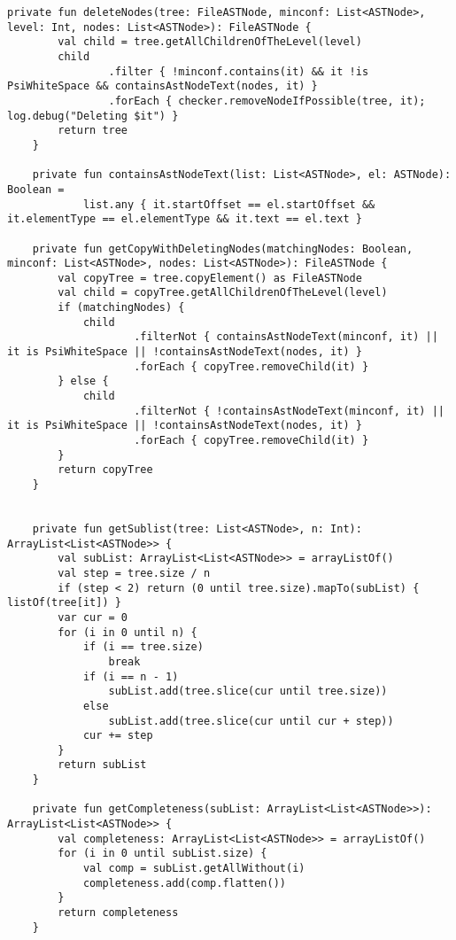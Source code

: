 \begin{lstlisting}[caption = Исходный код файла HierarchialDeltaDebugger.kt]
    private fun deleteNodes(tree: FileASTNode, minconf: List<ASTNode>, level: Int, nodes: List<ASTNode>): FileASTNode {
        val child = tree.getAllChildrenOfTheLevel(level)
        child
                .filter { !minconf.contains(it) && it !is PsiWhiteSpace && containsAstNodeText(nodes, it) }
                .forEach { checker.removeNodeIfPossible(tree, it); log.debug("Deleting $it") }
        return tree
    }

    private fun containsAstNodeText(list: List<ASTNode>, el: ASTNode): Boolean =
            list.any { it.startOffset == el.startOffset && it.elementType == el.elementType && it.text == el.text }

    private fun getCopyWithDeletingNodes(matchingNodes: Boolean, minconf: List<ASTNode>, nodes: List<ASTNode>): FileASTNode {
        val copyTree = tree.copyElement() as FileASTNode
        val child = copyTree.getAllChildrenOfTheLevel(level)
        if (matchingNodes) {
            child
                    .filterNot { containsAstNodeText(minconf, it) || it is PsiWhiteSpace || !containsAstNodeText(nodes, it) }
                    .forEach { copyTree.removeChild(it) }
        } else {
            child
                    .filterNot { !containsAstNodeText(minconf, it) || it is PsiWhiteSpace || !containsAstNodeText(nodes, it) }
                    .forEach { copyTree.removeChild(it) }
        }
        return copyTree
    }


    private fun getSublist(tree: List<ASTNode>, n: Int): ArrayList<List<ASTNode>> {
        val subList: ArrayList<List<ASTNode>> = arrayListOf()
        val step = tree.size / n
        if (step < 2) return (0 until tree.size).mapTo(subList) { listOf(tree[it]) }
        var cur = 0
        for (i in 0 until n) {
            if (i == tree.size)
                break
            if (i == n - 1)
                subList.add(tree.slice(cur until tree.size))
            else
                subList.add(tree.slice(cur until cur + step))
            cur += step
        }
        return subList
    }

    private fun getCompleteness(subList: ArrayList<List<ASTNode>>): ArrayList<List<ASTNode>> {
        val completeness: ArrayList<List<ASTNode>> = arrayListOf()
        for (i in 0 until subList.size) {
            val comp = subList.getAllWithout(i)
            completeness.add(comp.flatten())
        }
        return completeness
    }


\end{lstlisting}
